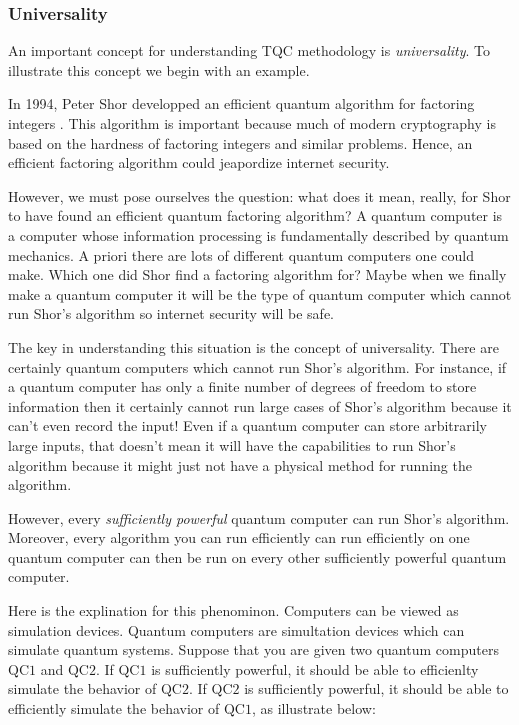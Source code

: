 \subsubsection{Universality}

An important concept for understanding TQC methodology is \textit{universality}. To illustrate this concept we begin with an example.

In 1994, Peter Shor developped an efficient quantum algorithm for factoring integers \cite{shor1994algorithms}. This algorithm is important because much of modern cryptography is based on the hardness of factoring integers and similar problems. Hence, an efficient factoring algorithm could jeapordize internet security.

However, we must pose ourselves the question: what does it mean, really, for Shor to have found an efficient quantum factoring algorithm? A quantum computer is a computer whose information processing is fundamentally described by quantum mechanics. A priori there are lots of different quantum computers one could make. Which one did Shor find a factoring algorithm for? Maybe when we finally make a quantum computer it will be the type of quantum computer which cannot run Shor's algorithm so internet security will be safe.

The key in understanding this situation is the concept of universality. There are certainly quantum computers which cannot run Shor's algorithm. For instance, if a quantum computer has only a finite number of degrees of freedom to store information then it certainly cannot run large cases of Shor's algorithm because it can't even record the input! Even if a quantum computer can store arbitrarily large inputs, that doesn't mean it will have the capabilities to run Shor's algorithm because it might just not have a physical method for running the algorithm.

However, every \textit{sufficiently powerful} quantum computer can run Shor's algorithm. Moreover, every algorithm you can run efficiently can run efficiently on one quantum computer can then be run on every other sufficiently powerful quantum computer.

Here is the explination for this phenominon. Computers can be viewed as simulation devices. Quantum computers are simultation devices which can simulate quantum systems. Suppose that you are given two quantum computers $\text{QC}1$ and $\text{QC}2$. If $\text{QC}1$ is sufficiently powerful, it should be able to efficienlty simulate the behavior of $\text{QC}2$. If $\text{QC}2$ is sufficiently powerful, it should be able to efficiently simulate the behavior of $\text{QC}1$, as illustrate below:


